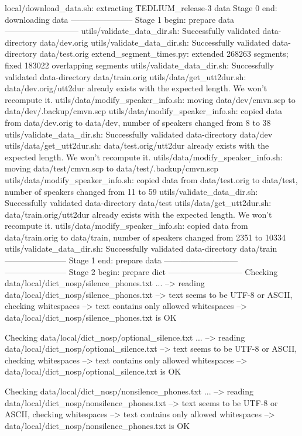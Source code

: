 local/download_data.sh: extracting TEDLIUM_release-3 data
Stage 0 end: downloading data
----------------------- Stage 1 begin: prepare data ---------------------------
utils/validate_data_dir.sh: Successfully validated data-directory data/dev.orig
utils/validate_data_dir.sh: Successfully validated data-directory data/test.orig
extend_segment_times.py: extended 268263 segments; fixed 183022 overlapping segments
utils/validate_data_dir.sh: Successfully validated data-directory data/train.orig
utils/data/get_utt2dur.sh: data/dev.orig/utt2dur already exists with the expected length.  We won't recompute it.
utils/data/modify_speaker_info.sh: moving data/dev/cmvn.scp to data/dev/.backup/cmvn.scp
utils/data/modify_speaker_info.sh: copied data from data/dev.orig to data/dev, number of speakers changed from 8 to 38
utils/validate_data_dir.sh: Successfully validated data-directory data/dev
utils/data/get_utt2dur.sh: data/test.orig/utt2dur already exists with the expected length.  We won't recompute it.
utils/data/modify_speaker_info.sh: moving data/test/cmvn.scp to data/test/.backup/cmvn.scp
utils/data/modify_speaker_info.sh: copied data from data/test.orig to data/test, number of speakers changed from 11 to 59
utils/validate_data_dir.sh: Successfully validated data-directory data/test
utils/data/get_utt2dur.sh: data/train.orig/utt2dur already exists with the expected length.  We won't recompute it.
utils/data/modify_speaker_info.sh: copied data from data/train.orig to data/train, number of speakers changed from 2351 to 10334
utils/validate_data_dir.sh: Successfully validated data-directory data/train
----------------------- Stage 1 end: prepare data ---------------------------
----------------------- Stage 2 begin: prepare dict ---------------------------
Checking data/local/dict_nosp/silence_phones.txt ...
--> reading data/local/dict_nosp/silence_phones.txt
--> text seems to be UTF-8 or ASCII, checking whitespaces
--> text contains only allowed whitespaces
--> data/local/dict_nosp/silence_phones.txt is OK

Checking data/local/dict_nosp/optional_silence.txt ...
--> reading data/local/dict_nosp/optional_silence.txt
--> text seems to be UTF-8 or ASCII, checking whitespaces
--> text contains only allowed whitespaces
--> data/local/dict_nosp/optional_silence.txt is OK

Checking data/local/dict_nosp/nonsilence_phones.txt ...
--> reading data/local/dict_nosp/nonsilence_phones.txt
--> text seems to be UTF-8 or ASCII, checking whitespaces
--> text contains only allowed whitespaces
--> data/local/dict_nosp/nonsilence_phones.txt is OK

